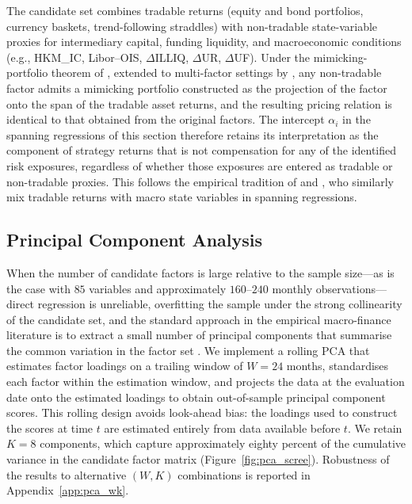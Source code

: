The candidate set combines tradable returns (equity and bond
portfolios, currency baskets, trend-following straddles) with
non-tradable state-variable proxies for intermediary capital,
funding liquidity, and macroeconomic conditions (e.g., HKM\_IC,
Libor--OIS, $\Delta$ILLIQ, $\Delta$UR, $\Delta$UF). Under the
mimicking-portfolio theorem of \citet{huberman1987mimicking},
extended to multi-factor settings by \citet{breeden1989empirical},
any non-tradable factor admits a mimicking portfolio constructed
as the projection of the factor onto the span of the tradable
asset returns, and the resulting pricing relation is identical to
that obtained from the original factors. The intercept $\alpha_i$
in the spanning regressions of this section therefore retains its
interpretation as the component of strategy returns that is not
compensation for any of the identified risk exposures, regardless
of whether those exposures are entered as tradable or non-tradable
proxies. This follows the empirical tradition of
\citet{fung2004hedge} and \citet{ludvigson2009macro}, who similarly
mix tradable returns with macro state variables in spanning
regressions.

\subsection{Principal Component Analysis}
\label{sec:pca}

When the number of candidate factors is large relative to the sample
size---as is the case with $85$ variables and approximately $160$--$240$
monthly observations---direct regression is unreliable, overfitting the sample under the strong collinearity of the candidate set, and the standard approach in the
empirical macro-finance literature is to extract a small number of
principal components that summarise the common variation in the
factor set \citep{ludvigson2009macro}. We implement a rolling PCA that
estimates factor loadings on a trailing window of $W = 24$ months,
standardises each factor within the estimation window, and projects
the data at the evaluation date onto the estimated loadings to obtain
out-of-sample principal component scores. This rolling design avoids
look-ahead bias: the loadings used to construct the scores at time $t$
are estimated entirely from data available before $t$. We retain
$K = 8$ components, which capture approximately eighty percent of the
cumulative variance in the candidate factor matrix
(Figure~\ref{fig:pca_scree}). Robustness of the results to alternative
$(W, K)$ combinations is reported in Appendix~\ref{app:pca_wk}.


